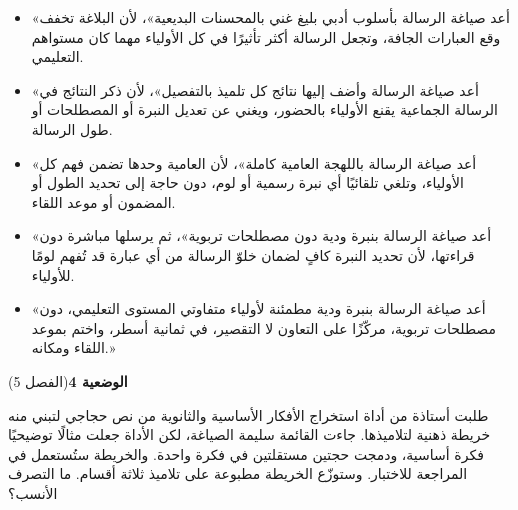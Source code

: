 \documentclass[11pt,a4paper]{article}
\begin{document}
\begin{itemize}[leftmargin=1.0cm, labelsep=6pt, itemsep=3pt, topsep=4pt, parsep=0pt]
  \item[\textbf{أ)}] «أعد صياغة الرسالة بأسلوب أدبي بليغ غني بالمحسنات البديعية»، لأن البلاغة تخفف وقع العبارات الجافة، وتجعل الرسالة أكثر تأثيرًا في كل الأولياء مهما كان مستواهم التعليمي.
  \item[\textbf{ب)}] «أعد صياغة الرسالة وأضف إليها نتائج كل تلميذ بالتفصيل»، لأن ذكر النتائج في الرسالة الجماعية يقنع الأولياء بالحضور، ويغني عن تعديل النبرة أو المصطلحات أو طول الرسالة.
  \item[\textbf{ج)}] «أعد صياغة الرسالة باللهجة العامية كاملة»، لأن العامية وحدها تضمن فهم كل الأولياء، وتلغي تلقائيًا أي نبرة رسمية أو لوم، دون حاجة إلى تحديد الطول أو المضمون أو موعد اللقاء.
  \item[\textbf{د)}] «أعد صياغة الرسالة بنبرة ودية دون مصطلحات تربوية»، ثم يرسلها مباشرة دون قراءتها، لأن تحديد النبرة كافٍ لضمان خلوّ الرسالة من أي عبارة قد تُفهم لومًا للأولياء.
  \item[\textbf{هـ)}] «أعد صياغة الرسالة بنبرة ودية مطمئنة لأولياء متفاوتي المستوى التعليمي، دون مصطلحات تربوية، مركّزًا على التعاون لا التقصير، في ثمانية أسطر، واختم بموعد اللقاء ومكانه.»
\end{itemize}
\par\vspace{6pt}
\noindent
{\large\khatt\textbf{الوضعية 4}}\hfill{\small(الفصل 5)}\par\nopagebreak\vspace{3pt}
\setlength{\fboxsep}{7pt}\colorbox{gray!10}{\parbox{\dimexpr\linewidth-14pt}{طلبت أستاذة من أداة استخراج الأفكار الأساسية والثانوية من نص حجاجي لتبني منه خريطة ذهنية لتلاميذها. جاءت القائمة سليمة الصياغة، لكن الأداة جعلت مثالًا توضيحيًا فكرة أساسية، ودمجت حجتين مستقلتين في فكرة واحدة. والخريطة ستُستعمل في المراجعة للاختبار. وستوزّع الخريطة مطبوعة على تلاميذ ثلاثة أقسام. ما التصرف الأنسب؟}}\par\nopagebreak
\end{document}
